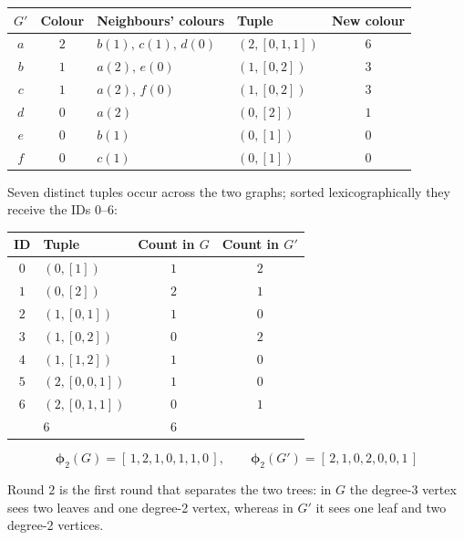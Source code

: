 \documentclass[11pt]{article}
\begin{document}
\begin{center}
\begin{tabular}{c c l l c}
\toprule
\rowcolor{white}
$G'$ & Colour & Neighbours' colours & Tuple & New colour \\
\midrule
$a$ & $2$ & $b(1),\,c(1),\,d(0)$ & $(2,[0,1,1])$ & $6$ \\
$b$ & $1$ & $a(2),\,e(0)$        & $(1,[0,2])$   & $3$ \\
$c$ & $1$ & $a(2),\,f(0)$        & $(1,[0,2])$   & $3$ \\
$d$ & $0$ & $a(2)$               & $(0,[2])$     & $1$ \\
$e$ & $0$ & $b(1)$               & $(0,[1])$     & $0$ \\
$f$ & $0$ & $c(1)$               & $(0,[1])$     & $0$ \\
\bottomrule
\end{tabular}
\end{center}

Seven distinct tuples occur across the two graphs; sorted lexicographically they receive
the IDs $0$--$6$:

\noindent\begin{minipage}{\linewidth}
\begin{center}
\begin{tabular}{c l c c}
\toprule
\rowcolor{white}
ID & Tuple & Count in $G$ & Count in $G'$ \\
\midrule
$0$ & $(0,[1])$     & $1$ & $2$ \\
$1$ & $(0,[2])$     & $2$ & $1$ \\
$2$ & $(1,[0,1])$   & $1$ & $0$ \\
$3$ & $(1,[0,2])$   & $0$ & $2$ \\
$4$ & $(1,[1,2])$   & $1$ & $0$ \\
$5$ & $(2,[0,0,1])$ & $1$ & $0$ \\
$6$ & $(2,[0,1,1])$ & $0$ & $1$ \\
\midrule
\rowcolor{white}
\multicolumn{2}{r}{\textbf{total}} & $6$ & $6$ \\
\bottomrule
\end{tabular}
\end{center}
\end{minipage}

\[
  \boldsymbol{\phi}_2(G)=[\,1,2,1,0,1,1,0\,],\qquad
  \boldsymbol{\phi}_2(G')=[\,2,1,0,2,0,0,1\,]
\]

Round $2$ is the first round that separates the two trees: in $G$ the degree-3 vertex sees
two leaves and one degree-2 vertex, whereas in $G'$ it sees one leaf and two degree-2
vertices.
\end{document}
